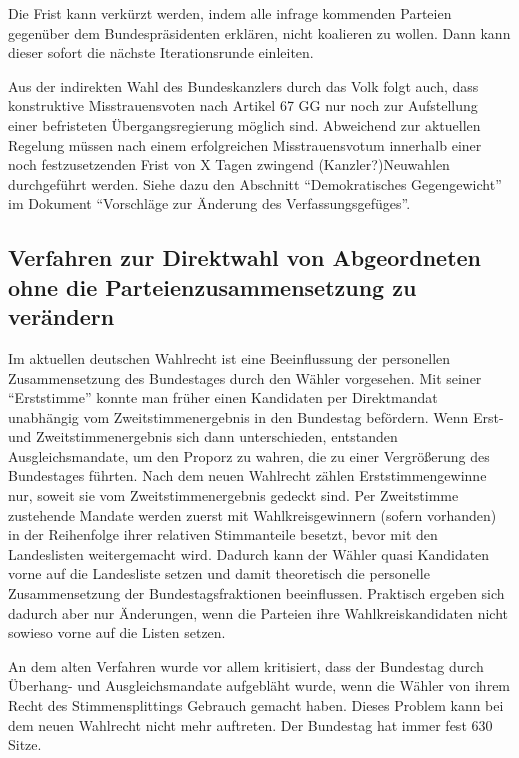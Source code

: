 Die Frist
kann verkürzt werden, indem alle infrage kommenden Parteien gegenüber dem Bundespräsidenten erklären, nicht koalieren zu wollen.
Dann kann dieser sofort die nächste Iterationsrunde einleiten.


Aus der indirekten Wahl des Bundeskanzlers durch das Volk folgt auch, dass konstruktive Misstrauensvoten nach Artikel 67 GG
nur noch zur Aufstellung einer befristeten Übergangsregierung möglich sind. Abweichend zur aktuellen Regelung müssen nach
einem erfolgreichen Misstrauensvotum innerhalb einer noch festzusetzenden Frist von X Tagen zwingend (Kanzler?)Neuwahlen
durchgeführt werden. Siehe dazu den Abschnitt \enquote{Demokratisches Gegengewicht} im Dokument \enquote{Vorschläge zur Änderung des Verfassungsgefüges}.

\subsection{Verfahren zur Direktwahl von Abgeordneten ohne die Parteienzusammensetzung zu
  verändern}

Im aktuellen deutschen Wahlrecht ist eine Beeinflussung der personellen Zusammensetzung des
Bundestages durch den Wähler vorgesehen. Mit seiner \enquote{Erststimme} konnte man früher einen
Kandidaten per Direktmandat unabhängig vom Zweitstimmenergebnis in den Bundestag befördern. Wenn
Erst- und Zweitstimmenergebnis sich dann unterschieden, entstanden Ausgleichsmandate, um den
Proporz zu wahren, die zu einer Vergrößerung des Bundestages führten. Nach dem neuen Wahlrecht
zählen Erststimmengewinne nur, soweit sie vom Zweitstimmenergebnis gedeckt sind. Per Zweitstimme
zustehende Mandate werden zuerst mit Wahlkreisgewinnern (sofern vorhanden) in der Reihenfolge
ihrer relativen Stimmanteile besetzt, bevor mit den Landeslisten weitergemacht wird. Dadurch kann
der Wähler quasi Kandidaten vorne auf die Landesliste setzen und damit theoretisch die personelle
Zusammensetzung der Bundestagsfraktionen beeinflussen. Praktisch ergeben sich dadurch aber nur
Änderungen, wenn die Parteien ihre Wahlkreiskandidaten nicht sowieso vorne auf die Listen setzen.

An dem alten Verfahren wurde vor allem kritisiert, dass der Bundestag durch Überhang- und
Ausgleichsmandate aufgebläht wurde, wenn die Wähler von ihrem Recht des Stimmensplittings
Gebrauch gemacht haben. Dieses Problem kann bei dem neuen Wahlrecht nicht mehr auftreten. Der
Bundestag hat immer fest 630 Sitze.

